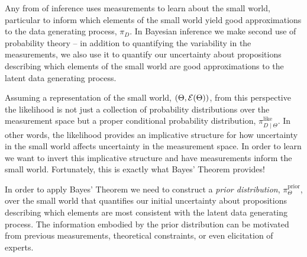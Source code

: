 Any from of inference uses measurements to learn about the
small world, particular to inform which elements of the small
world yield good approximations to the data generating process,
$\pi_{D}$.  In Bayesian inference we make second use of 
probability theory -- in addition to quantifying the variability in 
the measurements, we also use it to quantify our uncertainty 
about propositions describing which elements of the small world 
are good approximations to the latent data generating process.

Assuming a representation of the small world, 
$\left( \Theta,  \mathcal{E} \! \left( \Theta \right)  \right)$, from this perspective the 
likelihood is not just a collection of probability distributions over 
the measurement space but a proper conditional probability 
distribution, $\pi_{D \mid \Theta}^{\mathrm{like}}$.  In other words, 
the likelihood provides an implicative structure for how uncertainty 
in the small world affects uncertainty in the measurement space.  
In order to learn we want to invert this implicative structure and 
have measurements inform the small world.  Fortunately, this is 
exactly what Bayes' Theorem provides!

In order to apply Bayes' Theorem we need to construct a 
\emph{prior distribution}, $\pi_{\Theta}^{\mathrm{prior}}$, over the 
small world that quantifies our initial uncertainty about propositions
describing which elements are most consistent with the latent data 
generating process.  The information embodied by the prior distribution 
can be motivated from previous measurements, theoretical constraints, 
or even elicitation of experts.  

